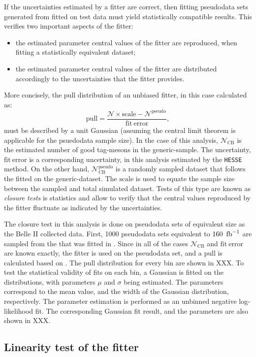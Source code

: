 If the uncertainties estimated by a fitter are correct, then fitting pseudodata sets generated from  fitted on test data must yield statistically compatible results.
This verifies two important aspects of the fitter:
\begin{itemize}
    \item the estimated parameter central values of the fitter are reproduced, when fitting a statistically equivalent dataset;
    \item the estimated parameter central values of the fitter are distributed accordingly to the uncertainties that the fitter provides.
\end{itemize}

More concisely, the pull distribution of an unbiased fitter, in this case calculated as:
\begin{equation}\label{eq:toy_pull}
    \mathrm{pull} = \frac{\mathcal{N}\times \mathrm{scale} - \mathcal{N}^{\mathrm{pseudo}}}{\mathrm{fit~error}},
\end{equation}
must be described by a unit Gaussian (assuming the central limit theorem is applicable for the psuedodata sample size).
In the case of this analysis, $\mathcal{N}_{\mathrm{CB}}$ is the estimated number of good tag-\B mesons in the generic-\MC sample.
The uncertainty, $\mathrm{fit~error}$ is a corresponding uncertainty, in this analysis estimated by the \texttt{HESSE} method.
On the other hand, $\mathcal{N}^{\mathrm{pseudo}}_{\mathrm{CB}}$ is a randomly sampled dataset that follows the  fitted on the generic-\MC dataset.
The $\mathrm{scale}$ is used to equate the sample size between the sampled and total simulated dataset.
Tests of this type are known as \textit{closure tests} is statistics and allow to verify that the central values reproduced by the fitter fluctuate as indicated by the \PDF uncertainties.

The closure test in this analysis is done on pseudodata sets of equivalent size as the Belle II collected data.
First, 1000 pseudodata sets equivalent to $\mathrm{160~\mbox{\,fb}^{-1}}$ are sampled from the \PDF that was fitted in .
Since in all of the cases $\mathcal{N}_{\mathrm{CB}}$ and $\mathrm{fit~error}$ are known exactly, the \Mbc fitter is used on the pseudodata set, and a $\mathrm{pull}$ is calculated based on .
The pull distribution for every \EB bin are shown in XXX.
To test the statistical validity of \Mbc fits on each bin, a Gaussian \PDF is fitted on the distributions, with parameters $\mu$ and $\sigma$ being estimated.
The parameters correspond to the mean value, and the width of the Gaussian distribution, respectively.
The parameter estimation is performed as an unbinned negative log-likelihood fit.
The corresponding Gaussian fit result, and the parameters are also shown in XXX.

\subsection{Linearity test of the \texorpdfstring{\Mbc}{Mbc} fitter}\label{sec:linearity_test}
